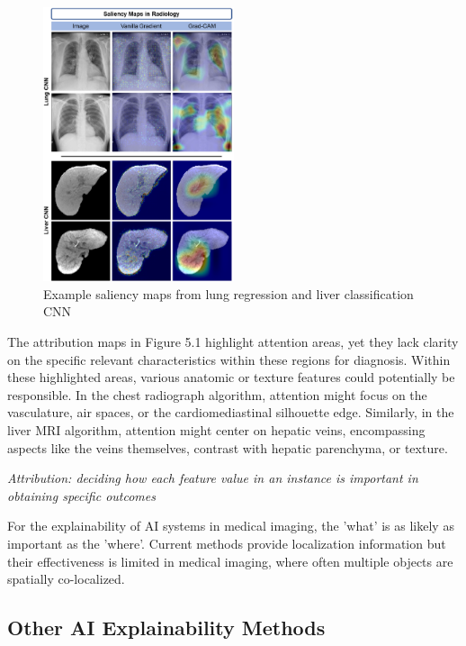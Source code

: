 \begin{figure}
    \centering
    \includegraphics[width=0.5\textwidth]{Images/figan_limitation.png}
    \caption[Limitations of current explainability methods]{Example saliency maps from lung regression and liver classification CNN\cite{FIGAN}}
\end{figure}

\noindent
The attribution maps in Figure 5.1 highlight attention areas, yet they lack clarity on the specific relevant characteristics within these regions for diagnosis. Within these highlighted areas, various anatomic or texture features could potentially be responsible. In the chest radiograph algorithm, attention might focus on the vasculature, air spaces, or the cardiomediastinal silhouette edge. Similarly, in the liver MRI algorithm, attention might center on hepatic veins, encompassing aspects like the veins themselves, contrast with hepatic parenchyma, or texture.

\noindent
\textit{Attribution: deciding how each feature value in an instance is important in \mbox{obtaining} specific outcomes}

\clearpage

\noindent
For the explainability of AI systems in medical imaging, the 'what' is as likely as important as the 'where'. Current methods provide localization information but their effectiveness is limited in medical imaging, where often multiple objects are spatially co-localized.

\subsection{Other AI Explainability Methods}

